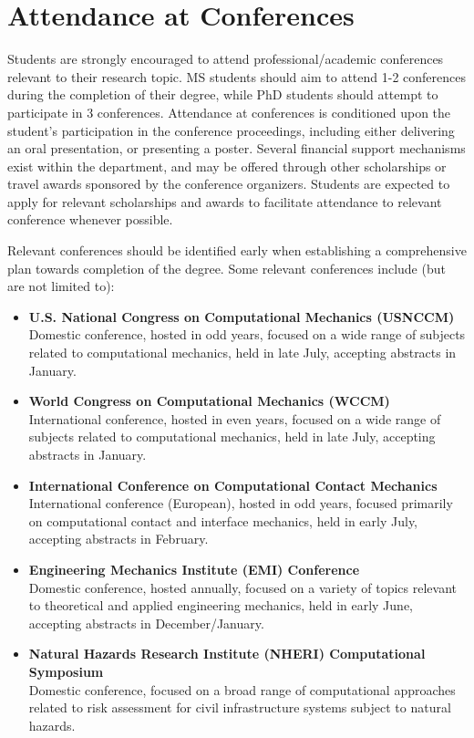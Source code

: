 \documentclass[12pt,a4paper,article,oneside]{memoir} %
\begin{document}

\section{Attendance at Conferences}

Students are strongly encouraged to attend professional/academic conferences relevant to their research topic. MS students should aim to attend 1-2 conferences during the completion of their degree, while PhD students should attempt to participate in 3 conferences. Attendance at conferences is conditioned upon the student's participation in the conference proceedings, including either delivering an oral presentation, or presenting a poster. Several financial support mechanisms exist within the department, and may be offered through other scholarships or travel awards sponsored by the conference organizers. Students are expected to apply for relevant scholarships and awards to facilitate attendance to relevant conference whenever possible.

Relevant conferences should be identified early when establishing a comprehensive plan towards completion of the degree. Some relevant conferences include (but are not limited to):
\begin{itemize}
\item \textbf{U.S. National Congress on Computational Mechanics (USNCCM)} \\ Domestic conference, hosted in odd years, focused on a wide range of subjects related to computational mechanics, held in late July, accepting abstracts in January.
\item \textbf{World Congress on Computational Mechanics (WCCM)} \\ International conference, hosted in even years, focused on a wide range of subjects related to computational mechanics, held in late July, accepting abstracts in January.
\item \textbf{International Conference on Computational Contact Mechanics} \\ International conference (European), hosted in odd years, focused primarily on computational contact and interface mechanics, held in early July, accepting abstracts in February.
\item \textbf{Engineering Mechanics Institute (EMI) Conference} \\ Domestic conference, hosted annually, focused on a variety of topics relevant to theoretical and applied engineering mechanics, held in early June, accepting abstracts in December/January.
\item \textbf{Natural Hazards Research Institute (NHERI) Computational Symposium} \\ Domestic conference, focused on a broad range of computational approaches related to risk assessment for civil infrastructure systems subject to natural hazards.
\end{itemize}
\end{document}
